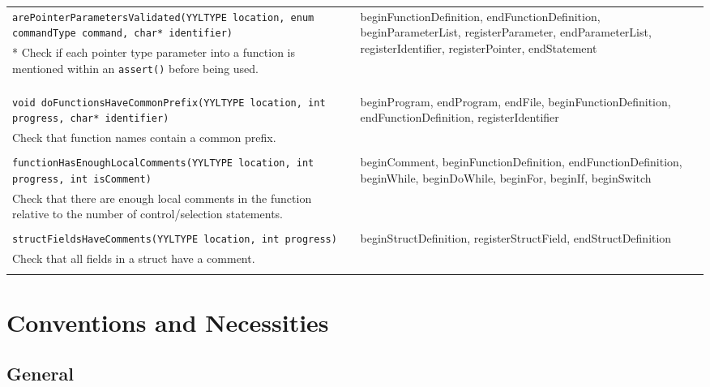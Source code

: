 \documentclass[12pt]{report}
\begin{document}
\begin{longtable}{p{9.5cm} p{\saxColSize}}
		\lstinline!arePointerParametersValidated(YYLTYPE location, enum commandType command, char* identifier)! & \multirow{2}{\saxColSize}{beginFunctionDefinition, endFunctionDefinition, beginParameterList, registerParameter, endParameterList, registerIdentifier, registerPointer, endStatement} \\ *
			Check if each pointer type parameter into a function is mentioned within an \lstinline!assert()! before being used. \vspace{\vertSize} \\ \\ \\ \\
		\lstinline!void doFunctionsHaveCommonPrefix(YYLTYPE location, int progress, char* identifier)! & \multirow{2}{\saxColSize}{beginProgram, endProgram, endFile, beginFunctionDefinition, endFunctionDefinition, registerIdentifier} \\*
			Check that function names contain a common prefix.  \vspace{\vertSize} \\ \\
		\lstinline!functionHasEnoughLocalComments(YYLTYPE location, int progress, int isComment)! & \multirow{2}{\saxColSize}{beginComment, beginFunctionDefinition, endFunctionDefinition, beginWhile, beginDoWhile, beginFor, beginIf, beginSwitch} \\*
			Check that there are enough local comments in the function relative to the number of control/selection statements.  \vspace{\vertSize} \\ \\ 
		\lstinline!structFieldsHaveComments(YYLTYPE location, int progress)! & \multirow{2}{\saxColSize}{beginStructDefinition, registerStructField, endStructDefinition} \\*
			Check that all fields in a struct have a comment.  \\

\vspace{1mm}
\end{longtable}

\doublespacing
\chapter{Conventions and Necessities}
\label{conventions}

\section{General}
\end{document}
